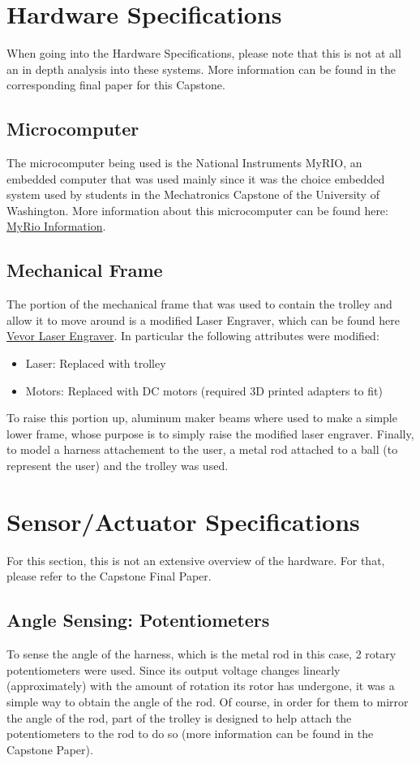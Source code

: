 \documentclass[letterpaper]{article}
\begin{document}
\newpage
\section{Hardware Specifications}
When going into the Hardware Specifications, please note that this is not at all an in depth analysis into these systems. More information can be found in the corresponding final paper for this Capstone.
\subsection{Microcomputer}
The microcomputer being used is the National Instruments MyRIO, an embedded computer that was used mainly since it was the choice embedded system used by students in the Mechatronics Capstone of the University of Washington. More information about this microcomputer can be found here: \hyperlink{https://www.ni.com/en/shop/engineering-education/portable-student-devices/myrio-student-embedded-device/what-is-myrio.html}{MyRio Information}.
\subsection{Mechanical Frame}
The portion of the mechanical frame that was used to contain the trolley and allow it to move around is a modified Laser Engraver, which can be found here \hyperlink{https://www.vevor.com/laser-engraving-machine-c_11141/vevor-laser-engraver-laser-engraving-machine-5w-compressed-spot-eye-protection-p_010907755157}{Vevor Laser Engraver}. In particular the following attributes were modified:
\begin{itemize}
    \item Laser: Replaced with trolley
    \item Motors: Replaced with DC motors (required 3D printed adapters to fit)
\end{itemize}
To raise this portion up, aluminum maker beams where used to make a simple lower frame, whose purpose is to simply raise the modified laser engraver.
Finally, to model a harness attachement to the user, a metal rod attached to a ball (to represent the user) and the trolley was used.

\section{Sensor/Actuator Specifications}
For this section, this is not an extensive overview of the hardware. For that, please refer to the Capstone Final Paper.
\subsection{Angle Sensing: Potentiometers}
To sense the angle of the harness, which is the metal rod in this case, 2 rotary potentiometers were used. Since its output voltage changes linearly (approximately) with the amount of rotation its rotor has undergone, it was a simple way to obtain the angle of the rod. Of course, in order for them to mirror the angle of the rod, part of the trolley is designed to help attach the potentiometers to the rod to do so (more information can be found in the Capstone Paper).
\end{document}
